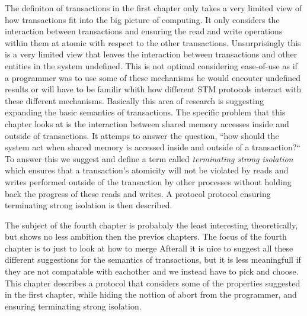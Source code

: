 The definiton of transactions in the first chapter only takes a very limited view of how
transactions fit into the big picture of computing.
It only considers the interaction between transactions and ensuring the read and write
operations within them at atomic with respect to the other transactions.
Unsurprisingly this is a very limited view that leaves the interaction between
transactions and other entities in the system undefined.
This is not optimal considering ease-of-use as if a programmer was to use
some of these mechanisms he would encouter undefined results or will have
to be familir whith how different STM protocols interact with these different mechanisms.
Basically this area of research is suggesting expanding the basic semantics of transactions.
The specific problem that this chapter looks at is the interaction between shared memory
accesses inside and outside of transactions.
It attemps to answer the question, ``how should the system act when shared memory
is accessed inside and outside of a transaction?``
To answer this we suggest and define a term called \emph{terminating strong isolation} which ensures
that a transaction's atomicity will not be violated by reads and writes performed
outside of the transaction by other processes without holding back the progress of
these reads and writes.
A protocol protocol ensuring terminating strong isolation is then described.

The subject of the fourth chapter is probabaly the least interesting theoretically, but
shows no less ambition then the previos chapters.
The focus of the fourth chapter is to just to look at how to merge 
Afterall it is nice to suggest all these different suggestions for the semantics
of transactions, but it is less meaningfull if they are not compatable with
eachother and we instead have to pick and choose.
This chapter describes a protocol that considers some of the properties suggested
in the first chapter, while hiding the nottion of abort from the programmer,
and ensuring terminating strong isolation. 







